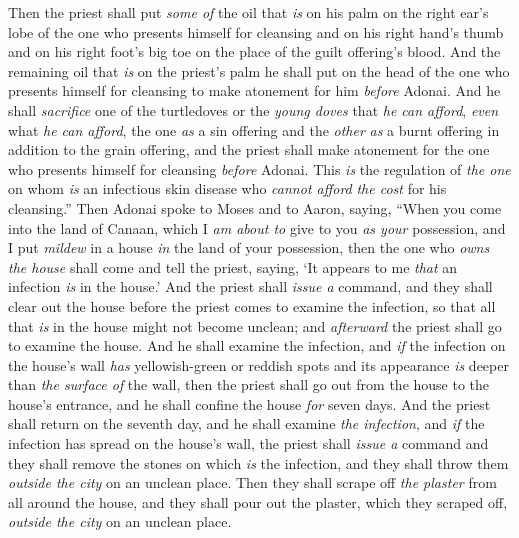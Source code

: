 \begin{biblechapter}
\verse Then the priest shall put \textit{some of} the oil that \textit{is} on his palm on the right ear’s lobe of the one who presents himself for cleansing and on his right hand’s thumb and on his right foot’s big toe on the place of the guilt offering’s blood.
\verse And the remaining oil that \textit{is} on the priest’s palm he shall put on the head of the one who presents himself for cleansing to make atonement for him \textit{before} Adonai.
\verse And he shall \textit{sacrifice} one of the turtledoves or the \textit{young doves} that \textit{he can afford},
\verse \textit{even} what \textit{he can afford}, the one \textit{as} a sin offering and the \textit{other} \textit{as} a burnt offering in addition to the grain offering, and the priest shall make atonement for the one who presents himself for cleansing \textit{before} Adonai.
\verse This \textit{is} the regulation of \textit{the one} on whom \textit{is} an infectious skin disease who \textit{cannot afford} \textit{the cost} for his cleansing.”
 Then Adonai spoke to Moses and to Aaron, saying,
\verse “When you come into the land of Canaan, which I \textit{am about to} give to you \textit{as your} possession, and I put \textit{mildew} in a house \textit{in} the land of your possession,
\verse then the one who \textit{owns the house} shall come and tell the priest, saying, ‘It appears to me \textit{that} an infection \textit{is} in the house.’
\verse And the priest shall \textit{issue a} command, and they shall clear out the house before the priest comes to examine the infection, so that all that \textit{is} in the house might not become unclean; and \textit{afterward} the priest shall go to examine the house.
\verse And he shall examine the infection, and \textit{if} the infection on the house’s wall \textit{has} yellowish-green or reddish spots and its appearance \textit{is} deeper than \textit{the surface of} the wall,
\verse then the priest shall go out from the house to the house’s entrance, and he shall confine the house \textit{for} seven days.
\verse And the priest shall return on the seventh day, and he shall examine \textit{the infection}, and \textit{if} the infection has spread on the house’s wall,
\verse the priest shall \textit{issue a} command and they shall remove the stones on which \textit{is} the infection, and they shall throw them \textit{outside the city} on an unclean place.
\verse Then they shall scrape off \textit{the plaster} from all around the house, and they shall pour out the plaster, which they scraped off, \textit{outside the city} on an unclean place.

\end{biblechapter}
